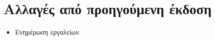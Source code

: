 \section*{Αλλαγές από προηγούμενη έκδοση}
\begin{itemize}
    \item Ενημέρωση εργαλείων.
\end{itemize}
\clearpage